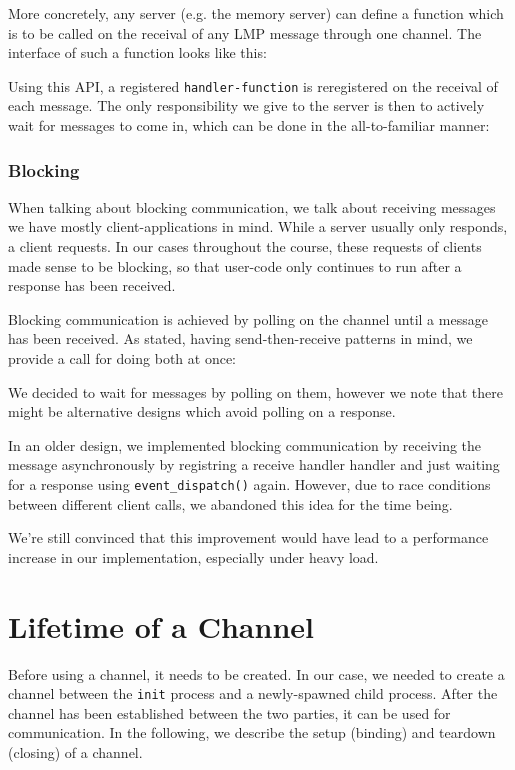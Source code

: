 More concretely, any server (e.g. the memory server) can define a function which is to be called
on the receival of any LMP message through one channel. The interface of such a function looks like this:


Using this API, a registered \texttt{handler-function} is reregistered on the receival
of each message. The only responsibility we give to the server is then to actively wait for 
messages to come in, which can be done in the all-to-familiar manner:


\subsubsection{Blocking}
When talking about blocking communication, we talk about receiving messages we have mostly 
client-applications in mind. While a server usually only responds, a client requests.
In our cases throughout the course, these requests of clients made sense to be blocking, 
so that user-code only continues to run after a response has been received.

Blocking communication is achieved by polling on the channel until a message has been received.
As stated, having send-then-receive patterns in mind, we provide a call for doing 
both at once:


We decided to wait for messages by polling on them, however we note that there might be 
alternative designs which avoid polling on a response. 

In an older design, we implemented blocking communication by receiving the message asynchronously 
by registring a receive handler handler and just waiting for a response 
using \texttt{event\_dispatch()} again.
However, due to race conditions between different client calls, we abandoned this idea 
for the time being. 

We're still convinced that this improvement would have lead to a performance increase in 
our implementation, especially under heavy load.

\section{Lifetime of a Channel}
Before using a channel, it needs to be created. 
In our case, we needed to create a channel between the \texttt{init} process and a newly-spawned
child process. After the channel has been established between the two parties, 
it can be used for communication. In the following, we describe the setup (binding) 
and teardown (closing) of a channel.

